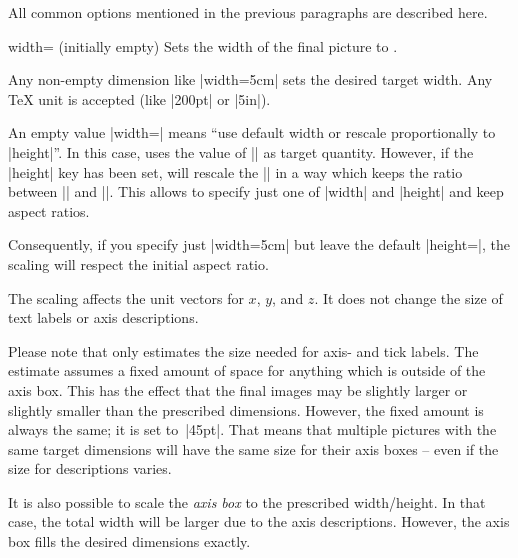 All common options mentioned in the previous paragraphs are described here.

\begin{pgfplotskey}{width= (initially empty)}
    Sets the width of the final picture to .

    Any non-empty dimension like |width=5cm| sets the desired target width. Any
    \TeX{} unit is accepted (like |200pt| or |5in|).

    An empty value |width={}| means ``use default width or rescale
    proportionally to |height|''. In this case, \PGFPlots{} uses the value of
    |\axisdefaultwidth| as target quantity. However, if the |height| key has
    been set, \PGFPlots{} will rescale the |\axisdefaultwidth| in a way which
    keeps the ratio between |\axisdefaultwidth| and |\axisdefaultheight|. This
    allows to specify just one of |width| and |height| and keep aspect ratios.

    Consequently, if you specify just |width=5cm| but leave the default
    |height={}|, the scaling will respect the initial aspect ratio.

    The scaling affects the unit vectors for $x$, $y$, and $z$. It does not
    change the size of text labels or axis descriptions.
\begin{codeexample}[]
\end{codeexample}

    Please note that \PGFPlots{} only estimates the size needed for axis- and
    tick labels. The estimate assumes a fixed amount of space for anything
    which is outside of the axis box. This has the effect that the final images
    may be slightly larger or slightly smaller than the prescribed dimensions.
    However, the fixed amount is always the same; it is set to~|45pt|. That
    means that multiple pictures with the same target dimensions will have the
    same size for their axis boxes -- even if the size for descriptions varies.

    It is also possible to scale the \emph{axis box} to the prescribed
    width/height. In that case, the total width will be larger due to the axis
    descriptions. However, the axis box fills the desired dimensions exactly.
\begin{codeexample}[]
\end{codeexample}


\end{pgfplotskey}
